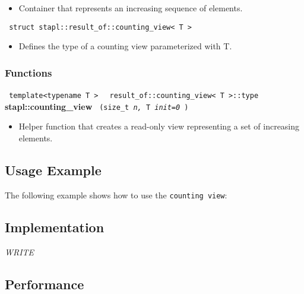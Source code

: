 \begin{itemize}
\item
Container that represents an increasing sequence of elements.
\end{itemize}

\noindent
\texttt{%
struct stapl::result\_of::counting\_view< T >
}

\begin{itemize}
\item
Defines the type of a counting view parameterized with T.
\end{itemize}

\subsubsection{Functions}

\noindent
\texttt{%
template<typename T >
}
\texttt{%
result\_of::counting\_view< T >::type
}
\newline
\textbf{stapl::counting\_view}%
\texttt{%
(size\_t
\textit{n,}%
T
\textit{init=0}%
)
}

\begin{itemize}
\item
Helper function that creates a read-only view representing a set of increasing elements.
\end{itemize}

\subsection{Usage Example} \label{sec-cnt-vw-use}

The following example shows how to use the \texttt{counting view}:


\subsection{Implementation} \label{sec-cnt-vw-impl}

\textit{WRITE}

\subsection{Performance} \label{sec-cnt-vw-perf}

